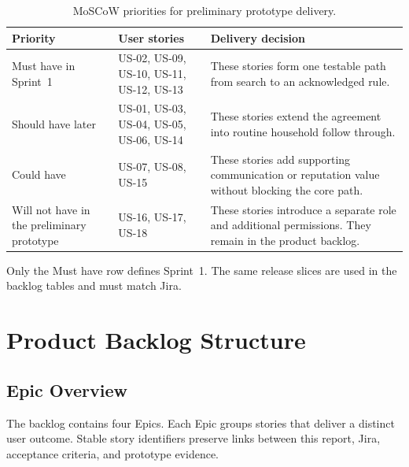 \documentclass[11pt,a4paper]{article}
\begin{document}
\begin{table}[H]
    \centering
    \small
    \caption{MoSCoW priorities for preliminary prototype delivery.}
    \begin{tabularx}{\textwidth}{@{}L{2.7cm}L{4.0cm}Y@{}}
        \toprule
        Priority & User stories & Delivery decision\\
        \midrule
        Must have in Sprint~1 & US-02, US-09, US-10, US-11, US-12, US-13 & These stories form one testable path from search to an acknowledged rule.\\
        Should have later & US-01, US-03, US-04, US-05, US-06, US-14 & These stories extend the agreement into routine household follow through.\\
        Could have & US-07, US-08, US-15 & These stories add supporting communication or reputation value without blocking the core path.\\
        Will not have in the preliminary prototype & US-16, US-17, US-18 & These stories introduce a separate role and additional permissions. They remain in the product backlog.\\
        \bottomrule
    \end{tabularx}
    \label{tabmoscow}
\end{table}

Only the Must have row defines Sprint~1. The same release slices are used in the backlog tables and must match Jira.

\section{Product Backlog Structure}
\label{secbacklog}

\subsection{Epic Overview}

The backlog contains four Epics. Each Epic groups stories that deliver a distinct user outcome. Stable story identifiers preserve links between this report, Jira, acceptance criteria, and prototype evidence.
\end{document}
